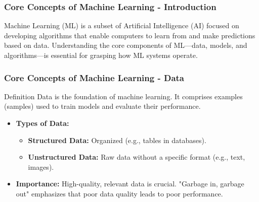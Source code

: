 \documentclass[aspectratio=169]{beamer}
\begin{document}
\begin{frame}[fragile]
    \frametitle{Core Concepts of Machine Learning - Introduction}
    Machine Learning (ML) is a subset of Artificial Intelligence (AI) focused on developing algorithms that enable computers to learn from and make predictions based on data. Understanding the core components of ML—data, models, and algorithms—is essential for grasping how ML systems operate.
\end{frame}

\begin{frame}[fragile]
    \frametitle{Core Concepts of Machine Learning - Data}
    \begin{block}{Definition}
        Data is the foundation of machine learning. It comprises examples (samples) used to train models and evaluate their performance.
    \end{block}

    \begin{itemize}
        \item \textbf{Types of Data:}
            \begin{itemize}
                \item \textbf{Structured Data:} Organized (e.g., tables in databases).
                \item \textbf{Unstructured Data:} Raw data without a specific format (e.g., text, images).
            \end{itemize}
        \item \textbf{Importance:} High-quality, relevant data is crucial. "Garbage in, garbage out" emphasizes that poor data quality leads to poor performance.
    \end{itemize}
\end{frame}
\end{document}
